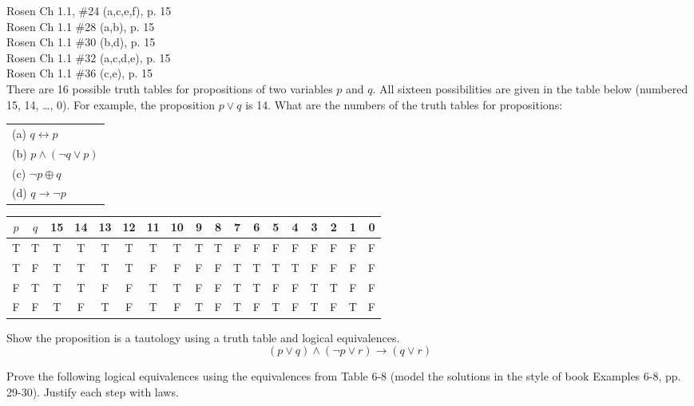 \documentclass[12pt,addpoints]{exam}
\begin{document}
\begin{questions}
\begin{solution}
\begin{itemize}
\question[8] Rosen Ch 1.1, \#24 (a,c,e,f), p. 15 \\


\question[6] Rosen Ch 1.1 \#28 (a,b), p. 15 \\

\question[2] Rosen Ch 1.1 \#30 (b,d), p. 15 \\

\question[16] Rosen Ch 1.1 \#32 (a,c,d,e), p. 15 \\

\question[8] Rosen Ch 1.1 \#36 (c,e), p. 15 \\


\question[8] There are 16 possible truth tables for propositions of two variables $p$ and $q$.
 All sixteen possibilities are given in the table below (numbered 15, 14, \ldots, 0).
 For example, the proposition $p \vee q$ is 14. What are the numbers of the truth
 tables for propositions:\\
 \begin{tabular}{l}
    (a) $q \leftrightarrow p$ \\
    (b) $p \wedge (\neg q \vee p)$ \\
    (c) $\neg p \oplus q $ \\
    (d) $q \rightarrow \neg p$ \\
 \end{tabular}

 \begin{tabular}{cc|cccc|cccc|cccc|cccc}
    $p$ & $q$ & 15 & 14 & 13 & 12 & 11 & 10 & 9 & 8 & 7 & 6 & 5 & 4 & 3 & 2 & 1 & 0 \\
    \hline
    T & T & T & T & T & T & T & T & T & T & F & F & F & F & F & F & F & F \\
    T & F & T & T & T & T & F & F & F & F & T & T & T & T & F & F & F & F \\
    F & T & T & T & F & F & T & T & F & F & T & T & F & F & T & T & F & F \\
    F & F & T & F & T & F & T & F & T & F & T & F & T & F & T & F & T & F \\
 \end{tabular}

\question[8] Show the proposition is a tautology using a truth table
and logical equivalences.
 $$ (p \vee q) \wedge (\neg p \vee r) \rightarrow (q \vee r) $$


\question[12] Prove the following logical equivalences using the
equivalences from Table 6-8 (model the solutions in the style of
book Examples 6-8, pp. 29-30).  Justify each step with laws.
    \begin{parts}

\end{parts}
\end{itemize}
\end{solution}
\end{questions}
\end{document}
